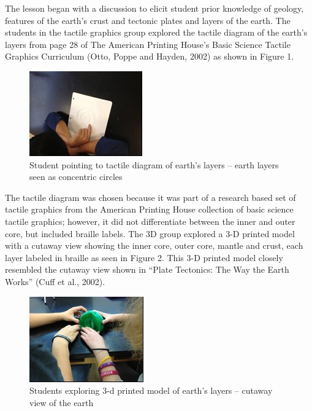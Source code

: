 \documentclass[11.5pt]{sig-alternate} %
\begin{document}
\begin{large}
The lesson began with a discussion to elicit student prior knowledge of geology, features of the earth’s crust and tectonic plates and layers of the earth.  The students in the tactile graphics group explored the tactile diagram of the earth’s layers from page 28 of The American Printing House’s Basic Science Tactile Graphics Curriculum (Otto, Poppe and Hayden, 2002) as shown in Figure 1.  
 
\begin{figure}[h]
     \centering
     \includegraphics{images/fig1.jpg}
     \caption{Student pointing to tactile diagram of earth’s layers – earth layers seen as concentric circles}
 \end{figure} 
 
The tactile diagram was chosen because it was part of a research based set of tactile graphics from the American Printing House collection of basic science tactile graphics; however, it did not differentiate between the inner and outer core, but included braille labels.   The 3D group explored a 3-D printed model with a cutaway view showing the inner core, outer core, mantle and crust, each layer labeled in braille as seen in Figure 2.  This 3-D printed model closely resembled the cutaway view shown in “Plate Tectonics: The Way the Earth Works” (Cuff et al., 2002). 
   
\begin{figure}[h]
    \centering
    \includegraphics{images/fig2.jpg}
    \caption{Students exploring 3-d printed model of earth’s layers – cutaway view of the earth}
\end{figure}


\end{large}
\end{document}
